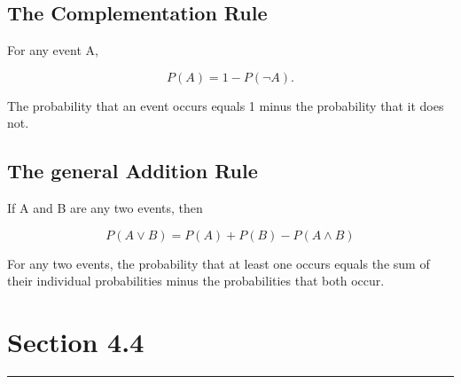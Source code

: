 \documentclass[12pt]{article}
\begin{document}
        \subsection*{The Complementation Rule}
            For any event A,
            \begin{center}
                \[
                    P(A) = 1 - P(\neg A).                
                \]
            \end{center}
            The probability that an event occurs equals 1 minus the probability that it does not.
        \subsection*{The general Addition Rule}
            If A and B are any two events, then
            \begin{center}
                \[
                    P(A \vee B) = P(A) + P(B) - P(A \wedge B) 
                \]
            \end{center}
            For any two events, the probability that at least one occurs equals the sum of their
            individual probabilities minus the probabilities that both occur.

    \section*{Section 4.4}
    \noindent\rule{\textwidth}{0.4pt}
\end{document}
